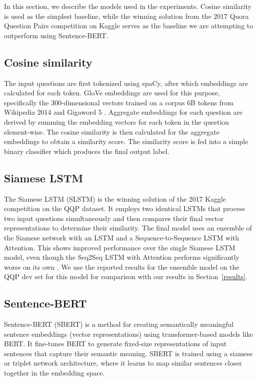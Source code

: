 \documentclass[10pt, a4paper]{article}
\begin{document}
In this section, we describe the models used in the experiments.
Cosine similarity is used as the simplest baseline, while the winning solution from the 2017 Quora Question Pairs competition on Kaggle serves as the baseline we are attempting to outperform using Sentence-BERT.

\subsection{Cosine similarity} \label{cosine-similarity}

The input questions are first tokenized using spaCy, after which embeddings are calculated for each token.
GloVe embeddings are used for this purpose, specifically the 300-dimensional vectors trained on a corpus 6B tokens from Wikipedia 2014 and Gigaword 5 \citep{pennington2014glove}.
Aggregate embeddings for each question are derived by summing the embedding vectors for each token in the question element-wise.
The cosine similarity is then calculated for the aggregate embeddings to obtain a similarity score.
The similarity score is fed into a simple binary classifier which produces the final output label.

\subsection{Siamese LSTM} \label{siamese-lstm}

The Siamese LSTM (SLSTM) is the winning solution of the 2017 Kaggle competition on the QQP dataset.
It employs two identical LSTMs that process two input questions simultaneously and then compares their final vector representations to determine their similarity.
The final model uses an ensemble of the Siamese network with an LSTM and a Sequence-to-Sequence LSTM with Attention.
This shows improved performance over the single Siamese LSTM model, even though the Seq2Seq LSTM with Attention performs significantly worse on its own \citep{dadashov2017quora}.
We use the reported results for the ensemble model on the QQP dev set for this model for comparison with our results in Section~\ref{results}.

\subsection{Sentence-BERT}

Sentence-BERT (SBERT) is a method for creating semantically meaningful sentence embeddings (vector representations) using transformer-based models like BERT. It fine-tunes BERT to generate fixed-size representations of input sentences that capture their semantic meaning. SBERT is trained using a siamese or triplet network architecture, where it learns to map similar sentences closer together in the embedding space.
\end{document}
